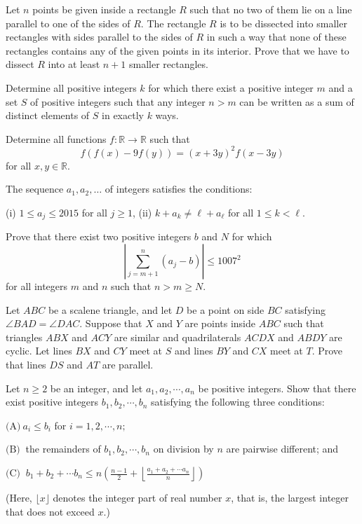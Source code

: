 \documentclass[11pt]{scrartcl}
\begin{document}
\begin{problem}[680055064158556]
Let $n$ points be given inside a rectangle $R$ such that no two of them lie on a line parallel to one of the sides of $R$. The rectangle $R$ is to be dissected into smaller rectangles with sides parallel to the sides of $R$ in such a way that none of these rectangles contains any of the given points in its interior. Prove that we have to dissect $R$ into at least $n + 1$ smaller rectangles.
\end{problem}
\begin{problem}[3975075785518808190]
Determine all positive integers $k$ for which there exist a positive integer $m$ and a set $S$ of positive integers such that any integer $n > m$ can be written as a sum of distinct elements of $S$ in exactly $k$ ways.
\end{problem}
\begin{problem}[646424364467534]
	Determine all functions $f:\mathbb{R} \rightarrow \mathbb{R}$ such that
$$f(f(x)-9f(y))=(x+3y)^2f(x-3y)$$for all $x,y\in \mathbb{R}$.
\end{problem}
\begin{problem}[736279317663030]
The sequence $a_1,a_2,\dots$ of integers satisfies the conditions:

(i) $1\le a_j\le2015$ for all $j\ge1$,
(ii) $k+a_k\neq \ell+a_\ell$ for all $1\le k<\ell$.

Prove that there exist two positive integers $b$ and $N$ for which\[\left\vert\sum_{j=m+1}^n(a_j-b)\right\vert\le1007^2\]for all integers $m$ and $n$ such that $n>m\ge N$.
\end{problem}
\begin{problem}[736821043753990]
Let $ABC$ be a scalene triangle, and let $D$ be a point on side $BC$ satisfying $\angle BAD=\angle DAC$. Suppose that $X$ and $Y$ are points inside $ABC$ such that triangles $ABX$ and $ACY$ are similar and quadrilaterals $ACDX$ and $ABDY$ are cyclic. Let lines $BX$ and $CY$ meet at $S$ and lines $BY$ and $CX$ meet at $T$. Prove that lines $DS$ and $AT$ are parallel.
\end{problem}
\begin{problem}[4777015574921577837]
	Let $n\ge 2$ be an integer, and let $a_1, a_2, \cdots , a_n$ be positive integers. Show that there exist positive integers $b_1, b_2, \cdots, b_n$ satisfying the following three conditions:

$\text{(A)} \ a_i\le b_i$ for $i=1, 2, \cdots , n;$

$\text{(B)} \ $ the remainders of $b_1, b_2, \cdots, b_n$ on division by $n$ are pairwise different; and

$\text{(C)} \ $ $b_1+b_2+\cdots b_n \le n\left(\frac{n-1}{2}+\left\lfloor \frac{a_1+a_2+\cdots a_n}{n}\right \rfloor \right)$

(Here, $\lfloor x \rfloor$ denotes the integer part of real number $x$, that is, the largest integer that does not exceed $x$.)
\end{problem}
\end{document}
